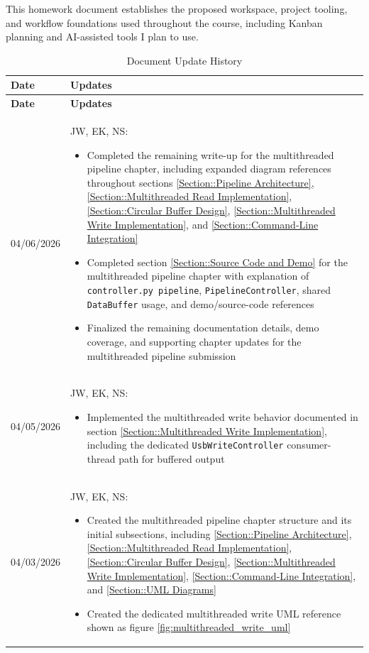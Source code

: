 This homework document establishes the proposed workspace,
project tooling, and workflow foundations used throughout
the course, including Kanban planning and AI-assisted tools I plan to use. 

\begin{longtable}{|l||p{13.5cm}|}
\caption{Document Update History \label{Table::UpdateHistory}}\\
\hline
\textbf{Date} & \textbf{Updates} \\
\hline
\endfirsthead

\hline
\textbf{Date} & \textbf{Updates} \\
\hline
\endhead

04/06/2026 & 
JW, EK, NS:
\begin{itemize}[topsep=0pt,itemsep=0pt,parsep=0pt,partopsep=0pt,leftmargin=12pt]
\item Completed the remaining write-up for the multithreaded pipeline chapter, including expanded diagram references throughout sections \ref{Section::Pipeline Architecture}, \ref{Section::Multithreaded Read Implementation}, \ref{Section::Circular Buffer Design}, \ref{Section::Multithreaded Write Implementation}, and \ref{Section::Command-Line Integration}
\item Completed section \ref{Section::Source Code and Demo} for the multithreaded pipeline chapter with explanation of \texttt{controller.py pipeline}, \texttt{PipelineController}, shared \texttt{DataBuffer} usage, and demo/source-code references
\item Finalized the remaining documentation details, demo coverage, and supporting chapter updates for the multithreaded pipeline submission
\end{itemize}
\\ \hline

04/05/2026 & 
JW, EK, NS:
\begin{itemize}[topsep=0pt,itemsep=0pt,parsep=0pt,partopsep=0pt,leftmargin=12pt]
\item Implemented the multithreaded write behavior documented in section \ref{Section::Multithreaded Write Implementation}, including the dedicated \texttt{UsbWriteController} consumer-thread path for buffered output
\end{itemize}
\\ \hline

04/03/2026 & 
JW, EK, NS:
\begin{itemize}[topsep=0pt,itemsep=0pt,parsep=0pt,partopsep=0pt,leftmargin=12pt]
\item Created the multithreaded pipeline chapter structure and its initial subsections, including \ref{Section::Pipeline Architecture}, \ref{Section::Multithreaded Read Implementation}, \ref{Section::Circular Buffer Design}, \ref{Section::Multithreaded Write Implementation}, \ref{Section::Command-Line Integration}, and \ref{Section::UML Diagrams}
\item Created the dedicated multithreaded write UML reference shown as figure \ref{fig:multithreaded_write_uml}
\end{itemize}
\\ \hline


\end{longtable}
